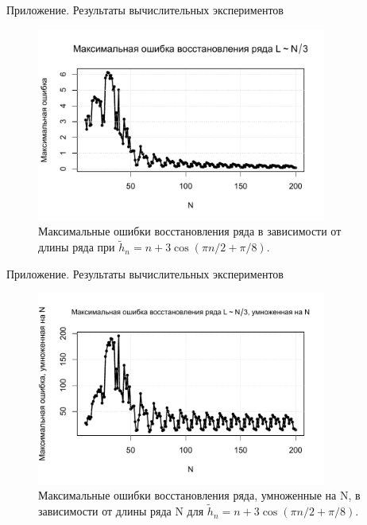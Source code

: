 \documentclass[notheorems, handout]{beamer}
\begin{document}
	\begin{frame}{Приложение. Результаты вычислительных экспериментов}
		\begin{figure}[!h]
			\includegraphics[width=0.85\textwidth]{Pictures/MaxERS.pdf}
			\caption{Максимальные ошибки восстановления ряда в зависимости от длины ряда при $\widetilde{h}_n = n + 3\cos(\pi n/2 + \pi/8)$.}\label{pic:1}
		\end{figure}
	\end{frame}
	\begin{frame}{Приложение. Результаты вычислительных экспериментов}
		\begin{figure}[!h]
			\includegraphics[width=0.85\textwidth]{Pictures/MaxERSNo.pdf}
			\caption{Максимальные ошибки восстановления ряда, умноженные на N, в зависимости от длины ряда N для $\widetilde{h}_n = n + 3\cos(\pi n/2 + \pi/8)$.}\label{pic:2}
		\end{figure}
	\end{frame}
	
\end{document}
